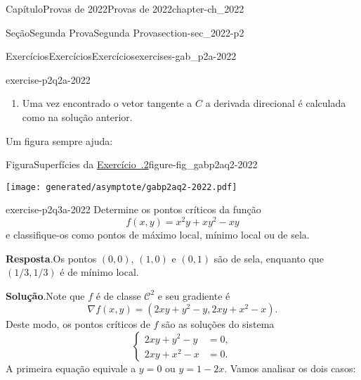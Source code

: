 \documentclass[oneside,10pt,]{book}
\newcommand{\blocktitlefont}{\relax}
\newcommand{\xreffont}{\relax}
\numberwithin{equation}{section}
\begin{document}
\begin{chapterptx}{Capítulo}{Provas de 2022}{}{Provas de 2022}{}{}{chapter-ch_2022}
\begin{sectionptx}{Seção}{Segunda Prova}{}{Segunda Prova}{}{}{section-sec_2022-p2}
\begin{exercises-subsection-numberless}{Exercícios}{Exercícios}{}{Exercícios}{}{}{exercises-gab_p2a-2022}
\begin{divisionexercise}{2}{}{}{exercise-p2q2a-2022}
\begin{enumerate}[label=\alph*]
\begin{equation*}
\left] -\frac{\pi}{4}, \frac{3\pi}{4}\right[,
\end{equation*}
concluímos que%
\begin{equation*}
\gamma'\left(\frac{\pi}{4}\right) =
\left( - \frac{1}{2}, \frac{1}{2}, 0\right)
\end{equation*}
é tangente a \(C\) em \((1,1,1)\). Note que este vetor é paralelo ao vetor \(\vec{v}\) obtido na solução anterior!%
\item{}Uma vez encontrado o vetor tangente a \(C\) a derivada direcional é calculada como na solução anterior.%
\end{enumerate}
%
\par
Um figura sempre ajuda:%
\begin{figureptx}{Figura}{Superfícies da \hyperlink{exercise-p2q2a-2022}{Exercício~{\xreffont 3.2.2}}}{figure-fig_gabp2aq2-2022}{}%
\begin{image}{0.25}{0.5}{0.25}{}%
\texttt{[image: generated/asymptote/gabp2aq2-2022.pdf]}
\end{image}%
\tcblower
\end{figureptx}%
\end{divisionexercise}%
\begin{divisionexercise}{3}{}{}{exercise-p2q3a-2022}%
Determine os pontos críticos da função%
\begin{equation*}
f(x,y) = x^2y +xy^2
-xy
\end{equation*}
e classifique-os como pontos de máximo local, mínimo local ou de sela.\par\smallskip%
\noindent\textbf{\blocktitlefont Resposta}.\hypertarget{answer-p2q3a-2022-b}{}\quad{}Os pontos \((0,0)\), \((1,0)\) e \((0,1)\) são de sela, enquanto que \((1/3,1/3)\) é de mínimo local.%
\par\smallskip%
\noindent\textbf{\blocktitlefont Solução}.\hypertarget{solution-p2q3a-2022-c}{}\quad{}Note que \(f\) é de classe \(\mathscr{C}^2\) e seu gradiente é%
\begin{equation*}
\nabla f(x,y) = (2xy+y^2 -y, 2xy+x^2 - x).
\end{equation*}
Deste modo, os pontos críticos de \(f\) são as soluções do sistema%
\begin{equation*}
\begin{cases} 2xy+y^2-y&=0,\\
2xy+x^2-x&=0.\end{cases}
\end{equation*}
A primeira equação equivale a \(y=0\) ou \(y=1-2x\). Vamos analisar os dois casos:%

\end{divisionexercise}
\end{exercises-subsection-numberless}
\end{sectionptx}
\end{chapterptx}
\end{document}
